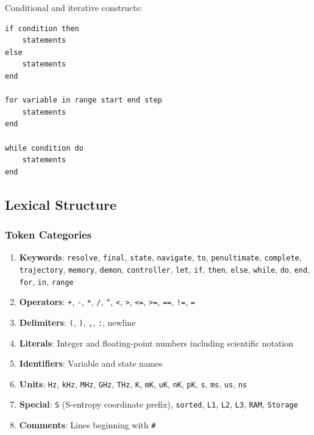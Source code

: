 \documentclass[twocolumn,10pt]{article}
\theoremstyle{definition}
\theoremstyle{remark}
\begin{document}
Conditional and iterative constructs:
\begin{lstlisting}
if condition then
    statements
else
    statements
end

for variable in range start end step
    statements
end

while condition do
    statements
end
\end{lstlisting}

\subsection{Lexical Structure}

\subsubsection{Token Categories}

\begin{enumerate}
    \item \textbf{Keywords}: \texttt{resolve}, \texttt{final}, \texttt{state}, \texttt{navigate}, \texttt{to}, \texttt{penultimate}, \texttt{complete}, \texttt{trajectory}, \texttt{memory}, \texttt{demon}, \texttt{controller}, \texttt{let}, \texttt{if}, \texttt{then}, \texttt{else}, \texttt{while}, \texttt{do}, \texttt{end}, \texttt{for}, \texttt{in}, \texttt{range}

    \item \textbf{Operators}: \texttt{+}, \texttt{-}, \texttt{*}, \texttt{/}, \texttt{\^}, \texttt{<}, \texttt{>}, \texttt{<=}, \texttt{>=}, \texttt{==}, \texttt{!=}, \texttt{=}

    \item \textbf{Delimiters}: \texttt{(}, \texttt{)}, \texttt{,}, \texttt{:}, newline

    \item \textbf{Literals}: Integer and floating-point numbers including scientific notation

    \item \textbf{Identifiers}: Variable and state names

    \item \textbf{Units}: \texttt{Hz}, \texttt{kHz}, \texttt{MHz}, \texttt{GHz}, \texttt{THz}, \texttt{K}, \texttt{mK}, \texttt{uK}, \texttt{nK}, \texttt{pK}, \texttt{s}, \texttt{ms}, \texttt{us}, \texttt{ns}

    \item \textbf{Special}: \texttt{S} (S-entropy coordinate prefix), \texttt{sorted}, \texttt{L1}, \texttt{L2}, \texttt{L3}, \texttt{RAM}, \texttt{Storage}

    \item \textbf{Comments}: Lines beginning with \texttt{\#}
\end{enumerate}
\end{document}
